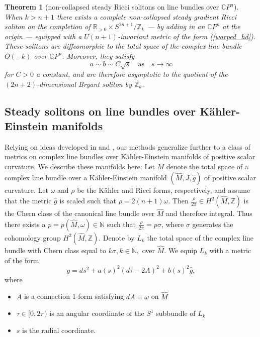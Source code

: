 \documentclass{amsart}
\newtheorem{thm}{Theorem}[section]
\theoremstyle{definition}
\theoremstyle{remark}
\numberwithin{equation}{section}
\newcommand{\R}{\mathbb{R}}  %
\newcommand{\N}{\mathbb{N}}
\begin{document}
\begin{thm}[non-collapsed steady Ricci solitons on line bundles over $\mathbb{C}P^n$]
\label{cor:CPn-solitons}
When $k > n+1$ there exists a complete non-collapsed steady gradient Ricci soliton on the completion of $\R_{>0} \times S^{2n+1}/\mathbb{Z}_k$ --- by adding in an $\mathbb{C}P^n$ at the origin --- equipped with a $U(n+1)$-invariant metric of the form (\ref{warped_hd}). These solitons are diffeomorphic to the total space of the complex line bundle $O(-k)$ over $\mathbb{C}P^n$. Moreover, they satisfy
$$a \sim b \sim C \sqrt{s} \quad \text{as} \quad s\rightarrow \infty$$ 
for $C>0$ a constant, and are therefore asymptotic to the quotient of the $(2n+2)$-dimensional Bryant soliton \cite{B05} by $\mathbb{Z}_k$.
\end{thm}


\subsection{Steady solitons on line bundles over K\"ahler-Einstein manifolds}
Relying on ideas developed in \cite{BB85} and \cite{PP87}, our methods generalize further to a class of metrics on complex line bundles over K\"ahler-Einstein manifolds of positive scalar curvature. We describe these manifolds here: Let $M$ denote the total space of a complex line bundle over a K\"ahler-Einstein manifold $(\hat{M},J,\hat{g})$ of positive scalar curvature. Let $\omega$ and $\rho$ be the K\"ahler and Ricci forms, respectively, and assume that the metric $\hat{g}$ is scaled such that $\rho = 2(n+1)\omega$. Then $\frac{\rho}{2\pi} \in H^2(\hat{M},\mathbb{Z})$ is the Chern class of the canonical line bundle over $\hat{M}$ and therefore integral. Thus there exists a $p=p(\hat{M}, \omega) \in \N$ such that $\frac{\rho}{2\pi} = p \sigma$, where 
$\sigma$ generates the cohomology group $H^2(\hat{M},\mathbb{Z})$. Denote by $L_{k}$ the total space of the complex line bundle with Chern class equal to $k \sigma, k \in \N,$ over $\hat{M}$. We equip $L_k$ with a metric of the form
\begin{equation}
\label{metric}
g = ds^2 + a(s)^2 \left(d\tau - 2A\right)^2 + b(s)^2 \hat{g},
\end{equation}
where 
\begin{itemize}
\item $A$ is a connection 1-form satisfying $dA = \omega$ on $\hat{M}$ 
\item $\tau \in [0, 2\pi)$ is an angular coordinate of the $S^1$ subbundle of $L_{k}$ 
\item $s$ is the radial coordinate. 
\end{itemize}
\end{document}
